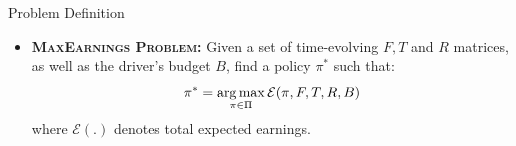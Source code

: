 \begin{frame}{Problem Definition}
\begin{itemize}
	\item[] \textbf{\textsc{MaxEarnings Problem}:} Given a set of time-evolving $F, T$ and $R$ matrices, as well as the driver's budget $B$, find a policy $\pi^\ast$ such that:
	\begin{equation*}
	\pi^\ast = \operatorname*{arg\,max}_{\pi \in \Pi} \mathcal{E}(\pi, F, T, R, B) 
	\end{equation*}
	where $\mathcal{E}(.)$ denotes total expected earnings.%
\end{itemize}
\pause
\end{frame}
